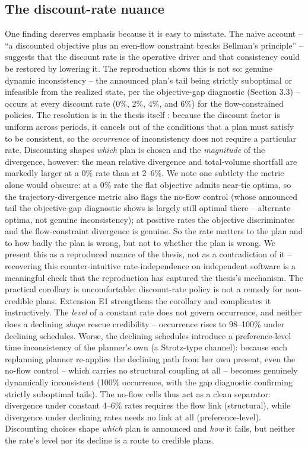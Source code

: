 \hypertarget{the-discount-rate-nuance}{%
\subsection{The discount-rate nuance}\label{the-discount-rate-nuance}}

One finding deserves emphasis because it is easy to misstate. The naive account -- ``a discounted objective plus an even-flow constraint breaks Bellman's principle'' -- suggests that the discount rate is the operative driver and that consistency could be restored by lowering it. The reproduction shows this is not so: genuine dynamic inconsistency -- the announced plan's tail being strictly suboptimal or infeasible from the realized state, per the objective-gap diagnostic (Section 3.3) -- occurs at every discount rate (0\%, 2\%, 4\%, and 6\%) for the flow-constrained policies. The resolution is in the thesis itself \citep[ch.~3, p.~58--59]{daugherty1991credibility}: because the discount factor is uniform across periods, it cancels out of the conditions that a plan must satisfy to be consistent, so the \emph{occurrence} of inconsistency does not require a particular rate. Discounting shapes \emph{which} plan is chosen and the \emph{magnitude} of the divergence, however: the mean relative divergence and total-volume shortfall are markedly larger at a 0\% rate than at 2--6\%. We note one subtlety the metric alone would obscure: at a 0\% rate the flat objective admits near-tie optima, so the trajectory-divergence metric also flags the no-flow control (whose announced tail the objective-gap diagnostic shows is largely still optimal there -- alternate optima, not genuine inconsistency); at positive rates the objective discriminates and the flow-constraint divergence is genuine. So the rate matters to the plan and to how badly the plan is wrong, but not to whether the plan is wrong. We present this as a reproduced nuance of the thesis, not as a contradiction of it -- recovering this counter-intuitive rate-independence on independent software is a meaningful check that the reproduction has captured the thesis's mechanism. The practical corollary is uncomfortable: discount-rate policy is not a remedy for non-credible plans. Extension E1 strengthens the corollary and complicates it instructively. The \emph{level} of a constant rate does not govern occurrence, and neither does a declining \emph{shape} rescue credibility -- occurrence rises to 98--100\% under declining schedules. Worse, the declining schedules introduce a preference-level time inconsistency of the planner's own (a Strotz-type channel): because each replanning planner re-applies the declining path from her own present, even the no-flow control -- which carries no structural coupling at all -- becomes genuinely dynamically inconsistent (100\% occurrence, with the gap diagnostic confirming strictly suboptimal tails). The no-flow cells thus act as a clean separator: divergence under constant 4--6\% rates requires the flow link (structural), while divergence under declining rates needs no link at all (preference-level). Discounting choices shape \emph{which} plan is announced and \emph{how} it fails, but neither the rate's level nor its decline is a route to credible plans.

